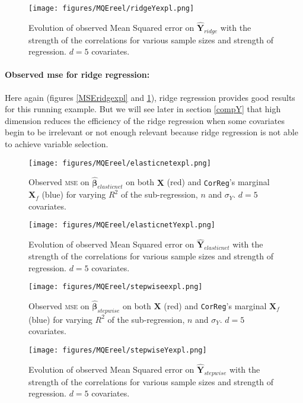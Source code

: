 \documentclass[12pt,a4paper]{report}
\begin{document}
	 \begin{figure}
	 \centering
	  \texttt{[image: figures/MQEreel/ridgeYexpl.png]}
	  \caption{Evolution of observed Mean Squared error on $\hat{\boldsymbol{Y}}_{ridge}$ with the strength of the correlations for various sample sizes and strength of regression. $d=5$ covariates. } \label{MQEridgeYexpl}
	\end{figure}	
	
		\paragraph{Observed {\sc mse} for ridge regression:}	
Here again (figures \ref{MSEridgexpl} and \ref{MQEridgeYexpl}), ridge regression provides good results for this running example. But we will see later in section \ref{compY} that high dimension reduces the efficiency of the ridge regression when some covariates begin to be irrelevant or not enough relevant because ridge regression is not able to achieve variable selection. \\


	\begin{figure}[h!]
	\texttt{[image: figures/MQEreel/elasticnetexpl.png]}
	\caption{Observed \textsc{mse} on $\hat{\boldsymbol{\beta}}_{elasticnet}$ on both $\boldsymbol{X}$ (red) and {\tt CorReg}'s marginal $\boldsymbol{X}_f$ (blue) for varying $R^2$ of the sub-regression, $n$ and $\sigma_Y$. $d=5$ covariates.}\label{MSEelasticnetexpl}
\end{figure} 
	
	 \begin{figure}
	 \centering
	  \texttt{[image: figures/MQEreel/elasticnetYexpl.png]}
	  \caption{Evolution of observed Mean Squared error on $\hat{\boldsymbol{Y}}_{elasticnet}$ with the strength of the correlations for various sample sizes and strength of regression. $d=5$ covariates. } \label{MQEelasticnetYexpl}
	\end{figure}
	\begin{figure}[h!]
	\texttt{[image: figures/MQEreel/stepwiseexpl.png]}\label{MSEstepwiseexpl}
	\caption{Observed \textsc{mse} on $\hat{\boldsymbol{\beta}}_{stepwise}$ on both $\boldsymbol{X}$ (red) and {\tt CorReg}'s marginal $\boldsymbol{X}_f$ (blue) for varying $R^2$ of the sub-regression, $n$ and $\sigma_Y$. $d=5$ covariates.}
\end{figure} 
	
	 \begin{figure}
	 \centering
	  \texttt{[image: figures/MQEreel/stepwiseYexpl.png]}
	  \caption{Evolution of observed Mean Squared error on $\hat{\boldsymbol{Y}}_{stepwise}$ with the strength of the correlations for various sample sizes and strength of regression. $d=5$ covariates. } \label{MQEstepwiseYexpl}
	\end{figure}
	
\end{document}
